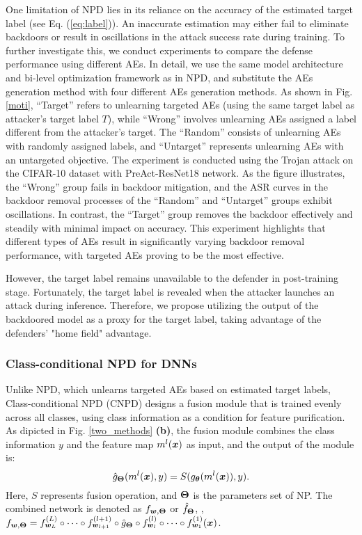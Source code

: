One limitation of NPD lies in its reliance on the accuracy of the estimated target label (see Eq. (\ref{eq:label})). An inaccurate estimation may either fail to eliminate backdoors or result in oscillations in the attack success rate during training.
To further investigate this, we conduct experiments to compare the defense performance using different AEs. 
In detail, we use the same model architecture and bi-level optimization framework as in NPD, and substitute the AEs generation method with four different AEs generation methods. As shown in Fig. \ref{moti}, ``Target'' refers to unlearning targeted AEs (using the same target label as attacker's target label $T$), while ``Wrong'' involves unlearning AEs assigned a label different from the attacker's target. The ``Random'' consists of unlearning AEs with randomly assigned labels, and ``Untarget'' represents unlearning AEs with an untargeted objective. The experiment is conducted using the Trojan attack \cite{Trojannn} on the CIFAR-10 dataset with PreAct-ResNet18 network.
As the figure illustrates, the ``Wrong'' group fails in backdoor mitigation, and the ASR curves in the backdoor removal processes of the ``Random'' and ``Untarget'' groups exhibit oscillations. In contrast, the ``Target'' group removes the backdoor effectively and steadily with minimal impact on accuracy. This experiment highlights that different types of AEs result in significantly varying backdoor removal performance, with targeted AEs proving to be the most effective.

However, the target label remains unavailable to the defender in post-training stage. Fortunately, the target label is revealed when the attacker launches an attack during inference. Therefore, we propose utilizing the output of the backdoored model as a proxy for the target label, taking advantage of the defenders' "home field" advantage.


\subsubsection{Class-conditional NPD for DNNs\label{sec3.3.2}}
Unlike NPD, which unlearns targeted AEs based on estimated target labels, Class-conditional NPD (CNPD) designs a fusion module that is trained evenly across all classes, using class information as a condition for feature purification.
As dipicted in Fig. \ref{two_methods} \textbf{(b)}, the fusion module combines the class information \( y \) and the feature map $m^{l}(\bm{x})$ as input, and the output of the module is:
\begin{equation}
    \hat{g}_{\bm{\Theta}}(m^{l}(\bm{x}),y) = S(g_{\bm{\theta}}(m^{l}(\bm{x})),y).
\end{equation}
Here, $S$ represents fusion operation, and $\bm{\Theta}$ is the parameters set of NP.
The combined network is denoted as $f_{\bm{w}, \bm{\Theta}}$ or $\hat{f}_{\bm{\Theta}}$, \ie, $f_{\bm{w}, \bm{\Theta}}=f^{(L)}_{\bm{w}_{L}} \circ \cdots \circ f^{(l+1)}_{\bm{w}_{l+1}} \circ \hat{g}_{\bm{\Theta}} \circ f^{(l)}_{\bm{w}_{l}} \circ \cdots \circ f^{(1)}_{\bm{w}_{1}} (\bm{x})$. 


